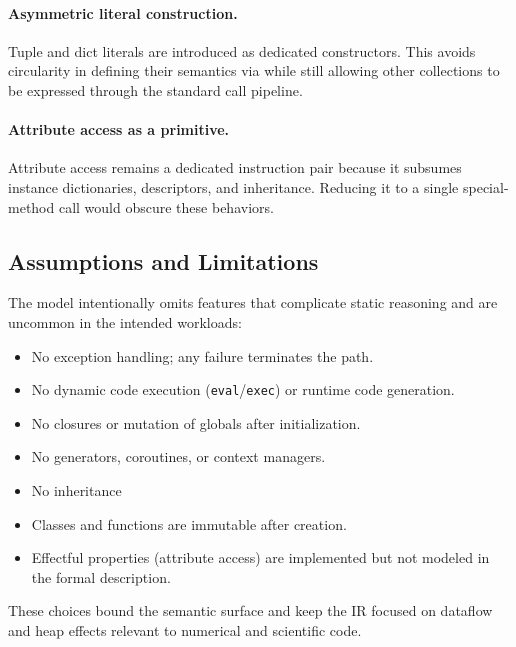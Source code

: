 \paragraph{Asymmetric literal construction.}
Tuple and dict literals are introduced as dedicated constructors. This avoids circularity in defining their semantics via \tCall while still allowing other collections to be expressed through the standard call pipeline.

\paragraph{Attribute access as a primitive.}
Attribute access remains a dedicated instruction pair because it subsumes instance dictionaries, descriptors, and inheritance. Reducing it to a single special-method call would obscure these behaviors.

\subsection{Assumptions and Limitations}

The model intentionally omits features that complicate static reasoning and are uncommon in the intended workloads:
\begin{itemize}
\item No exception handling; any failure terminates the path.
\item No dynamic code execution (\texttt{eval}/\texttt{exec}) or runtime code generation.
\item No closures or mutation of globals after initialization.
\item No generators, coroutines, or context managers.
\item No inheritance
\item Classes and functions are immutable after creation.
\item Effectful properties (attribute access) are implemented but not modeled in the formal description.
\end{itemize}
These choices bound the semantic surface and keep the IR focused on dataflow and heap effects relevant to numerical and scientific code.

\clearpage
